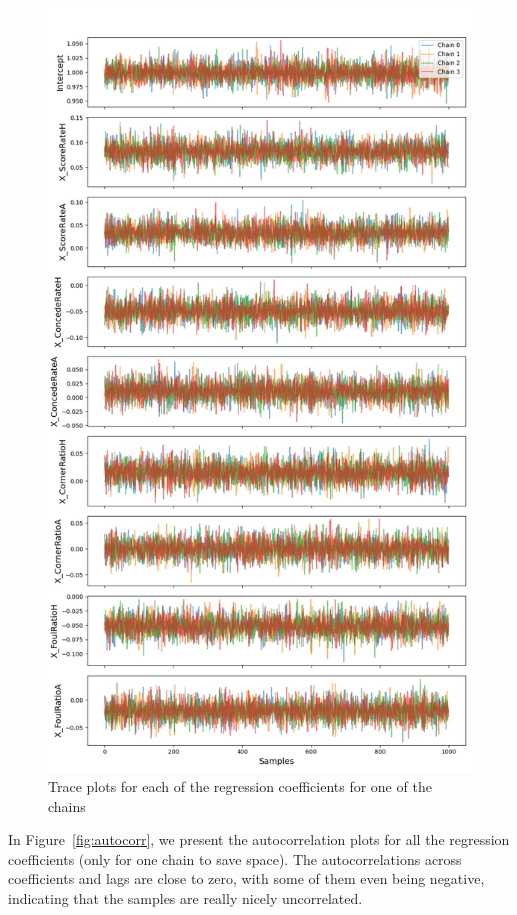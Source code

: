 \documentclass[9pt]{IEEEtran}
\begin{document}
\begin{figure}[h]
\centering
\includegraphics[width=1\columnwidth]{figures/trace.png}
\caption{Trace plots for each of the regression coefficients for one of the chains}
\label{fig:trace}
\end{figure}

In Figure~\ref{fig:autocorr}, we present the autocorrelation 
plots for all the regression coefficients 
(only for one chain to save space). The autocorrelations
 across  coefficients and lags are close to zero, with some of them even being
 negative, indicating that the samples are really nicely uncorrelated.
\end{document}
